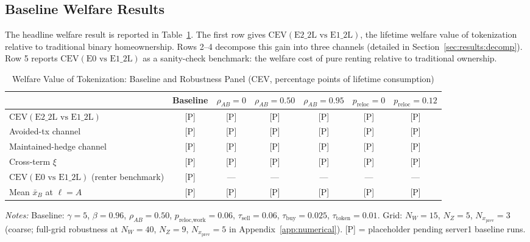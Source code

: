 \subsection{Baseline Welfare Results}
\label{sec:results:baseline}

The headline welfare result is reported in Table~\ref{tab:cev_baseline}.
The first row gives $\text{CEV}(\text{E2\_2L vs E1\_2L})$, the lifetime
welfare value of tokenization relative to traditional binary homeownership.
Rows 2--4 decompose this gain into three channels (detailed in
Section~\ref{sec:results:decomp}).
Row 5 reports $\text{CEV}(\text{E0 vs E1\_2L})$ as a sanity-check benchmark:
the welfare cost of pure renting relative to traditional ownership.

\begin{table}[t]
\centering
\caption{Welfare Value of Tokenization: Baseline and Robustness Panel
         (CEV, percentage points of lifetime consumption)}
\label{tab:cev_baseline}
\small
\begin{tabular}{lcccccc}
\toprule
 & Baseline & $\rho_{AB}=0$ & $\rho_{AB}=0.50$ & $\rho_{AB}=0.95$
 & $p_{\text{reloc}}=0$ & $p_{\text{reloc}}=0.12$ \\
\midrule
$\text{CEV}(\text{E2\_2L vs E1\_2L})$
    & \textsc{[P]} & \textsc{[P]} & \textsc{[P]} & \textsc{[P]}
    & \textsc{[P]} & \textsc{[P]} \\[2pt]
\quad Avoided-tx channel
    & \textsc{[P]} & \textsc{[P]} & \textsc{[P]} & \textsc{[P]}
    & \textsc{[P]} & \textsc{[P]} \\
\quad Maintained-hedge channel
    & \textsc{[P]} & \textsc{[P]} & \textsc{[P]} & \textsc{[P]}
    & \textsc{[P]} & \textsc{[P]} \\
\quad Cross-term $\xi$
    & \textsc{[P]} & \textsc{[P]} & \textsc{[P]} & \textsc{[P]}
    & \textsc{[P]} & \textsc{[P]} \\[4pt]
$\text{CEV}(\text{E0 vs E1\_2L})$ (renter benchmark)
    & \textsc{[P]} & --- & --- & --- & --- & --- \\
\addlinespace
Mean $\bar{x}_B$ at $\ell{=}A$
    & \textsc{[P]} & \textsc{[P]} & \textsc{[P]} & \textsc{[P]}
    & \textsc{[P]} & \textsc{[P]} \\
\bottomrule
\end{tabular}
\vspace{4pt}
\begin{minipage}{\linewidth}
\small\textit{Notes:}
Baseline: $\gamma=5$, $\beta=0.96$, $\rho_{AB}=0.50$,
$p_{\text{reloc,work}}=0.06$, $\tau_{\text{sell}}=0.06$,
$\tau_{\text{buy}}=0.025$, $\tau_{\text{token}}=0.01$.
Grid: $N_W=15$, $N_Z=5$, $N_{x_{\text{prev}}}=3$ (coarse; full-grid
robustness at $N_W=40$, $N_Z=9$, $N_{x_{\text{prev}}}=5$ in
Appendix~\ref{app:numerical}).
\textsc{[P]} = placeholder pending server1 baseline runs.
\end{minipage}
\end{table}

